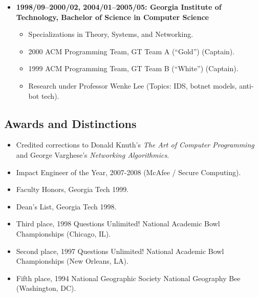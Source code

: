 \documentclass{article}
\newenvironment{tightitemize}
{\begin{itemize}
  \setlength{\itemsep}{1pt}
  \setlength{\parskip}{0pt}
  \setlength{\parsep}{0pt}}
{\end{itemize}}
\begin{document}
\begin{tightitemize}
\item \textbf{1998/09--2000/02, 2004/01--2005/05: Georgia Institute of Technology,
Bachelor of Science in Computer Science}
\begin{tightitemize}
\item Specializations in Theory, Systems, and Networking.
\item 2000 ACM Programming Team, GT Team A (``Gold'') (Captain).
\item 1999 ACM Programming Team, GT Team B (``White'') (Captain).
\item Research under Professor Wenke Lee (Topics: IDS, botnet models, anti-bot tech).
\end{tightitemize}
\end{tightitemize}

\vspace{2mm}
\subsection*{Awards and Distinctions}
\begin{tightitemize}
\item Credited corrections to Donald Knuth's \textit{The Art of Computer Programming}
   and George Varghese's \textit{Networking Algorithmics}.
\item Impact Engineer of the Year, 2007-2008 (McAfee / Secure Computing).
\item Faculty Honors, Georgia Tech 1999.
\item Dean's List, Georgia Tech 1998.
\item Third place, 1998 Questions Unlimited! National Academic Bowl Championships (Chicago, IL).
\item Second place, 1997 Questions Unlimited! National Academic Bowl Championships (New Orleans, LA).
\item Fifth place, 1994 National Geographic Society National Geography Bee (Washington, DC).
\end{tightitemize}

\vspace{2mm}
\end{document}

